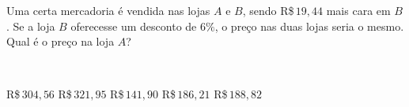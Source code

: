 \parbox{\linewidth}{

Uma certa mercadoria é vendida nas lojas $A$ e $B$, sendo R\$\,$19{,}44$ mais cara em $B$. Se a loja $B$ oferecesse um desconto de $6\%$, o preço nas duas lojas seria o mesmo. Qual é o preço na loja $A$?}\vspace{2mm}\\\parbox{\linewidth}{

R\$\,$304{,}56$
R\$\,$321{,}95$
R\$\,$141{,}90$
R\$\,$186{,}21$
R\$\,$188{,}82$

}

